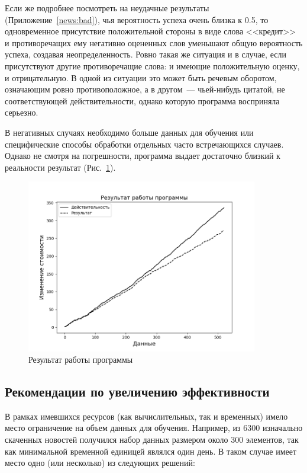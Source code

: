 \documentclass[14pt]{matmex-diploma-custom}
\begin{document}
Если же подробнее посмотреть на неудачные результаты (Приложение~\ref{news:bad}), чья вероятность успеха очень близка к 0.5, то одновременное присутствие положительной стороны в виде слова <<кредит>> и противоречащих ему негативно оцененных слов уменьшают общую вероятность успеха, создавая неопределенность. Ровно такая же ситуация и в случае, если присутствуют другие противоречащие слова: и имеющие положительную оценку, и отрицательную. В одной из ситуации это может быть речевым оборотом, означающим ровно противоположное, а в другом~--- чьей-нибудь цитатой, не соответствующей действительности, однако которую программа восприняла серьезно.

В негативных случаях необходимо больше данных для обучения или специфические способы обработки отдельных часто встречающихся случаев. Однако не смотря на погрешности, программа выдает достаточно близкий к реальности результат (Рис.~\ref{img:result}).

\begin{figure}[h]
\centering
\includegraphics[width=0.9\textwidth]{img/result}
\caption{Результат работы программы}
\label{img:result}
\end{figure}

\subsection{Рекомендации по увеличению эффективности}

В рамках имевшихся ресурсов (как вычислительных, так и временных) имело место ограничение на объем данных для обучения. Например, из 6300 изначально скаченных новостей получился набор данных размером около 300 элементов, так как минимальной временной единицей являлся один день. В таком случае имеет место одно (или несколько) из следующих решений:
\end{document}

